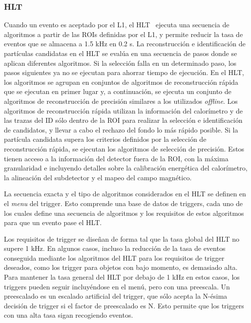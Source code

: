 \subsubsection{\acf{HLT}}


Cuando un evento es aceptado por el \ac{L1}, el \ac{HLT}~\cite{ATLAS-HLTTrigger} ejecuta una secuencia de algoritmos a partir de las \acp{ROI} definidas por el \ac{L1}, y permite reducir la tasa de eventos que se almacena a 1.5 kHz en 0.2 s.
La reconstrucción e identificación de partículas candidatas en el \ac{HLT} se evalúa en una secuencia de pasos donde se aplican diferentes algoritmos.
Si la selección falla en un determinado paso, los pasos siguientes ya no se ejecutan para ahorrar tiempo de ejecución.
En el \ac{HLT}, los algoritmos se agrupan en conjuntos de algoritmos de reconstrucción rápida que se ejecutan en primer lugar y, a continuación, se ejecuta un conjunto de algoritmos de reconstrucción de precisión similares a los utilizados \textit{offline}.
Los algoritmos de reconstrucción rápida utilizan la información del calorímetro y de las trazas del \ac{ID} sólo dentro de la \ac{ROI} para realizar la selección e identificación de candidatos, y llevar a cabo el rechazo del fondo lo más rápido posible.
Si la partícula candidata supera los criterios definidos por la selección de reconstrucción rápida, se ejecutan los algoritmos de selección de precisión. Estos tienen acceso a la información del detector fuera de la \ac{ROI}, con la máxima granularidad e incluyendo detalles sobre la calibración energética del calorímetro, la alineación del subdetector y el mapeo del campo magnético.

La secuencia exacta y el tipo de algoritmos considerados en el \ac{HLT} se definen en el \textit{menu} del trigger. Esto comprende una base de datos de triggers, cada uno de los cuales define una secuencia de algoritmos y los requisitos de estos algoritmos para que un evento pase el \ac{HLT}.

Los requisitos de trigger se diseñan de forma tal que la tasa global del \ac{HLT} no supere 1 kHz. En algunos casos, incluso la reducción de la tasa de eventos conseguida mediante los algoritmos del \ac{HLT} para los requisitos de trigger deseados, como los trigger para objetos con bajo momento, es demasiado alta. Para mantener la tasa general del \ac{HLT} por debajo de 1 kHz en estos casos, los triggers pueden seguir incluyéndose en el menú, pero con una preescala. Un preescalado es un escalado artificial del trigger, que sólo acepta la N-\'esima decisión de trigger si el factor de preescalado es N. Esto permite que los triggers con una alta tasa sigan recogiendo eventos.

